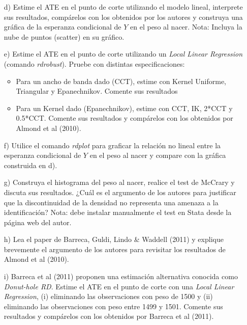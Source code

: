 \documentclass{article}
\begin{document}
\begin{enumerate}
\item[d)] Estime el ATE en el punto de corte utilizando el modelo lineal, interprete sus resultados, compárelos con los obtenidos por los autores y construya una gráfica de la esperanza condicional de $Y$ en el peso al nacer. Nota: Incluya la nube de puntos (scatter) en su gráfico.  

\item[e)] Estime el ATE en el punto de corte utilizando un \textit{Local Linear Regression} (comando \textit{rdrobust}). Pruebe con distintas especificaciones:
	\begin{itemize}
	\item Para un ancho de banda dado (CCT), estime con Kernel Uniforme, Triangular y Epanechnikov. Comente sus resultados
	\item Para un Kernel dado (Epanechnikov), estime con CCT, IK, 2*CCT y 0.5*CCT. Comente sus resultados y compárelos con los obtenidos por Almond et al (2010).
	\end{itemize}

\item[f)] Utilice el comando \textit{rdplot} para graficar la relación no lineal entre la esperanza condicional de $Y$ en el peso al nacer y compare con la gráfica construida en d).

\item[g)] Construya el histograma del peso al nacer, realice el test de McCrary y discuta sus resultados. ¿Cuál es el argumento de los autores para justificar que la discontinuidad de la densidad no representa una amenaza a la identificación? Nota: debe instalar manualmente el test en Stata desde la página web del autor.

\item[h)] Lea el paper de Barreca, Guldi, Lindo \& Waddell (2011) y explique brevemente el argumento de los autores para revisitar los resultados de Almond et al (2010).

\item[i)] Barreca et al (2011) proponen una estimación alternativa conocida como \textit{Donut-hole RD}. Estime el ATE en el punto de corte con una \textit{Local Linear Regression}, (i) eliminando las observaciones con peso de 1500 y (ii) eliminando las observaciones con peso entre 1499 y 1501. Comente sus resultados y compárelos con los obtenidos por Barreca et al (2011). 
\end{enumerate}
\end{document}
